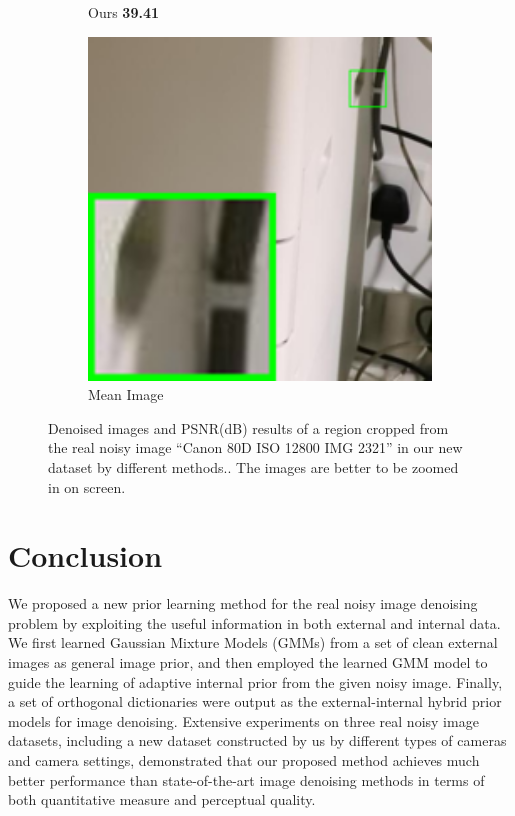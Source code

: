 \begin{figure}
\begin{subfigure}[t]{0.19\textwidth}
\caption{Ours \textbf{39.41}}
    \end{subfigure}
    \hfill
    \begin{subfigure}[t]{0.19\textwidth}
        \centering
        \includegraphics[width=1\textwidth]{images/guided/resize_br_Mean_Canon_80D_ISO12800_IMG_2321_part2.png}
\caption{Mean Image}
    \end{subfigure}
    \caption{Denoised images and PSNR(dB) results of a region cropped from the real noisy image ``Canon 80D ISO 12800 IMG 2321'' in our new dataset by different methods.. The images are better to be zoomed in on screen.}
    \label{fig11}
\end{figure}


\section{Conclusion}

We proposed a new prior learning method for the real noisy image denoising problem by exploiting the useful information in both external and internal data. We first learned Gaussian Mixture Models (GMMs) from a set of clean external images as general image prior, and then employed the learned GMM model to guide the learning of adaptive internal prior from the given noisy image. Finally, a set of orthogonal dictionaries were output as the external-internal hybrid prior models for image denoising. Extensive experiments on three real noisy image datasets, including a new dataset constructed by us by different types of cameras and camera settings, demonstrated that our proposed method achieves much better performance than state-of-the-art image denoising methods in terms of both quantitative measure and perceptual quality.



